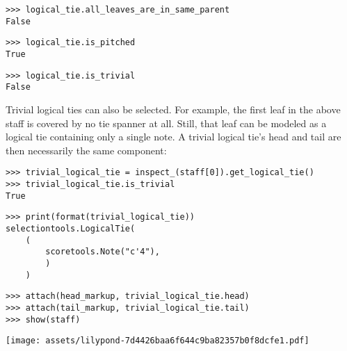 \begin{comment}
<abjad>
logical_tie.all_leaves_are_in_same_parent
logical_tie.is_pitched
logical_tie.is_trivial
</abjad>
\end{comment}

\begin{abjadbookoutput}
\begin{singlespacing}
\vspace{-0.5\baselineskip}
\begin{verbatim}
>>> logical_tie.all_leaves_are_in_same_parent
False
\end{verbatim}
\begin{verbatim}
>>> logical_tie.is_pitched
True
\end{verbatim}
\begin{verbatim}
>>> logical_tie.is_trivial
False
\end{verbatim}
\end{singlespacing}
\end{abjadbookoutput}

\noindent Trivial logical ties can also be selected. For example, the first
leaf in the above staff is covered by no tie spanner at all. Still, that leaf
can be modeled as a logical tie containing only a single note. A trivial
logical tie's head and tail are then necessarily the same component:

\begin{comment}
<abjad>
trivial_logical_tie = inspect_(staff[0]).get_logical_tie()
trivial_logical_tie.is_trivial
print(format(trivial_logical_tie))
attach(head_markup, trivial_logical_tie.head)
attach(tail_markup, trivial_logical_tie.tail)
show(staff)
</abjad>
\end{comment}

\begin{abjadbookoutput}
\begin{singlespacing}
\vspace{-0.5\baselineskip}
\begin{verbatim}
>>> trivial_logical_tie = inspect_(staff[0]).get_logical_tie()
>>> trivial_logical_tie.is_trivial
True
\end{verbatim}
\begin{verbatim}
>>> print(format(trivial_logical_tie))
selectiontools.LogicalTie(
    (
        scoretools.Note("c'4"),
        )
    )
\end{verbatim}
\begin{verbatim}
>>> attach(head_markup, trivial_logical_tie.head)
>>> attach(tail_markup, trivial_logical_tie.tail)
>>> show(staff)
\end{verbatim}
\noindent\texttt{[image: assets/lilypond-7d4426baa6f644c9ba82357b0f8dcfe1.pdf]}
\end{singlespacing}
\end{abjadbookoutput}

